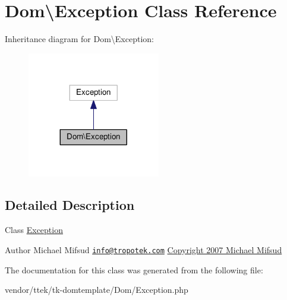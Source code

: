\hypertarget{classDom_1_1Exception}{\section{Dom\textbackslash{}Exception Class Reference}
\label{classDom_1_1Exception}
}


Inheritance diagram for Dom\textbackslash{}Exception\+:\nopagebreak
\begin{figure}[H]
\begin{center}
\leavevmode
\includegraphics[width=164pt]{classDom_1_1Exception__inherit__graph}
\end{center}
\end{figure}


\subsection{Detailed Description}
Class \hyperlink{classDom_1_1Exception}{Exception}

\begin{DoxyAuthor}{Author}
Michael Mifsud \href{mailto:info@tropotek.com}{\tt info@tropotek.\+com} \hyperlink{}{Copyright 2007 Michael Mifsud }
\end{DoxyAuthor}


The documentation for this class was generated from the following file\+:\begin{DoxyCompactItemize}
\item 
vendor/ttek/tk-\/domtemplate/\+Dom/Exception.\+php\end{DoxyCompactItemize}
